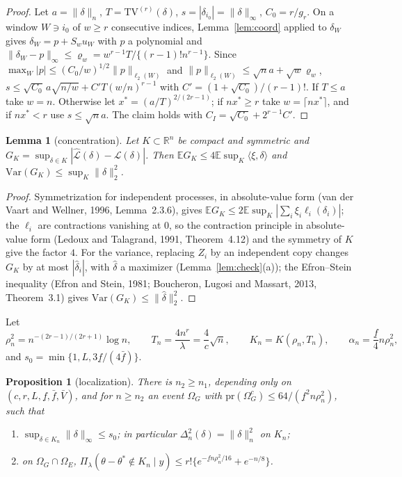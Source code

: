 \documentclass[11pt]{article}
\newtheorem{lemma}{Lemma}
\newtheorem{proposition}{Proposition}
\theoremstyle{definition}
\theoremstyle{remark}
\newcommand{\R}{\mathbb{R}}
\newcommand{\E}{\mathbb{E}}
\newcommand{\pr}{\mathrm{pr}}
\newcommand{\TV}{\mathrm{TV}}
\newcommand{\thetas}{\theta^{*}}
\newcommand{\Lh}{\widehat{\mathcal L}}
\newcommand{\Lm}{\mathcal L}
\newcommand{\fl}{\underline f}
\newcommand{\fu}{\bar f}
\newcommand{\Vb}{\bar V}
\newcommand{\nn}[1]{\|#1\|_n}
\begin{document}
\begin{proof}
Let $a=\nn{\delta}$, $T=\TV^{(r)}(\delta)$, $s=|\delta_{i_0}|=\|\delta\|_\infty$, $C_0=r/g_r$. On a window $W\ni i_0$ of $w\ge r$ consecutive indices, Lemma~\ref{lem:coord} applied to $\delta_W$ gives $\delta_W=p+S_wu_W$ with $p$ a polynomial and $\|\delta_W-p\|_\infty\le\varrho_w=w^{r-1}T/\{(r-1)!n^{r-1}\}$. Since $\max_W|p|\le(C_0/w)^{1/2}\|p\|_{\ell_2(W)}$ and $\|p\|_{\ell_2(W)}\le\sqrt na+\sqrt w\varrho_w$,
$s\le\sqrt{C_0}\,a\sqrt{n/w}+C'T(w/n)^{r-1}$ with $C'=(1+\sqrt{C_0})/(r-1)!$. If $T\le a$ take $w=n$. Otherwise let $x^{*}=(a/T)^{2/(2r-1)}$; if $nx^{*}\ge r$ take $w=\lceil nx^{*}\rceil$, and if $nx^{*}<r$ use $s\le\sqrt na$. The claim holds with $C_I=\sqrt{C_0}+2^{r-1}C'$.
\end{proof}

\begin{lemma}[concentration]\label{lem:conc}
Let $K\subset\R^n$ be compact and symmetric and $G_K=\sup_{\delta\in K}|\Lh(\delta)-\Lm(\delta)|$. Then
$\E G_K\le4\E\sup_K\langle\xi,\delta\rangle$ and $\mathrm{Var}(G_K)\le\sup_K\|\delta\|_2^2$.
\end{lemma}

\begin{proof}
Symmetrization for independent processes, in absolute-value form (van der Vaart and Wellner, 1996, Lemma~2.3.6), gives $\E G_K\le2\E\sup_K|\sum_i\xi_i\ell_i(\delta_i)|$; the $\ell_i$ are contractions vanishing at $0$, so the contraction principle in absolute-value form (Ledoux and Talagrand, 1991, Theorem~4.12) and the symmetry of $K$ give the factor $4$. For the variance, replacing $Z_i$ by an independent copy changes $G_K$ by at most $|\hat\delta_i|$, with $\hat\delta$ a maximizer (Lemma~\ref{lem:check}(a)); the Efron--Stein inequality (Efron and Stein, 1981; Boucheron, Lugosi and Massart, 2013, Theorem~3.1) gives $\mathrm{Var}(G_K)\le\|\hat\delta\|_2^2$.
\end{proof}

Let
\[
\rho_n^2=n^{-(2r-1)/(2r+1)}\log n,\qquad T_n=\frac{4n^r}{\lambda}=\frac4c\sqrt n,\qquad K_n=K(\rho_n,T_n),\qquad \alpha_n=\frac{\fl}4n\rho_n^2,
\]
and $s_0=\min\{1,L,3\fl/(4\fu)\}$.

\begin{proposition}[localization]\label{prop:local}
There is $n_2\ge n_1$, depending only on $(c,r,L,\fl,\fu,\Vb)$, and for $n\ge n_2$ an event $\Omega_G$ with $\pr(\Omega_G^c)\le64/(\fl^2n\rho_n^2)$, such that
\begin{enumerate}[label=(\alph*),itemsep=1pt,topsep=2pt]
\item $\sup_{\delta\in K_n}\|\delta\|_\infty\le s_0$; in particular $\Delta_n^2(\delta)=\nn{\delta}^2$ on $K_n$;
\item on $\Omega_G\cap\Omega_E$, $\Pi_\lambda(\theta-\thetas\notin K_n\mid y)\le r!\{e^{-\fl n\rho_n^2/16}+e^{-n/8}\}$.
\end{enumerate}
\end{proposition}
\end{document}

